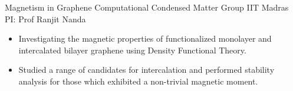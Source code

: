 
        {Magnetism in Graphene}
        {Computational Condensed Matter Group}
        {IIT Madras}
        {PI: Prof Ranjit Nanda}{
    \begin{itemize}
        \item Investigating the magnetic properties of functionalized monolayer and intercalated bilayer graphene using Density Functional Theory.
        \item Studied a range of candidates for intercalation and performed stability analysis for those which exhibited a non-trivial magnetic moment. 
    \end{itemize}
}
